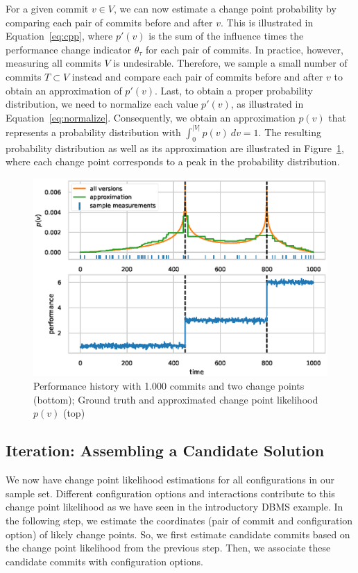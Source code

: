 \documentclass[sigconf]{acmart}
\begin{document}
	For a given commit $v\in V$, we can now estimate a change point probability by comparing each pair of commits before and after $v$.
	This is illustrated in Equation~\ref{eq:cpp}, where $p'(v)$ is the sum of the influence times the performance change indicator $\theta_\tau$ for each pair of commits.
	In practice, however, measuring all commits $V$ is undesirable.
	Therefore, we sample a small number of commits $T \subset V$ instead and compare each pair of commits before and after $v$ to obtain an approximation of $p'(v)$.
	Last, to obtain a proper probability distribution, we need to normalize each value $p'(v)$, as illustrated in Equation~\ref{eq:normalize}.
	Consequently, we obtain an approximation $p(v)$ that represents a probability distribution with $\int_0^{\vert V\vert} p(v)\ dv = 1$. The resulting probability distribution as well as its approximation are illustrated in Figure~\ref{fig:cpp_example}, where each change point corresponds to a peak in the probability distribution.

	\begin{figure}
		\centering
		\includegraphics[width=\linewidth]{images/cpp_example.eps}
		\caption{Performance history with 1.000 commits and two change points (bottom); Ground truth and approximated change point likelihood $p(v)$ (top)}
		\label{fig:cpp_example}
	\end{figure}

	\subsection{Iteration: Assembling a Candidate Solution}\label{sec:candidatesolution}
	We now have change point likelihood estimations for all configurations in our sample set. 
	Different configuration options and interactions contribute to this change point likelihood as we have seen in the introductory DBMS example. 
	In the following step, we estimate the coordinates (pair of commit and configuration option) of likely change points. 
So, we first estimate candidate commits based on the change point likelihood from the previous step. 
	Then, we associate these candidate commits with configuration options.
	
\end{document}
